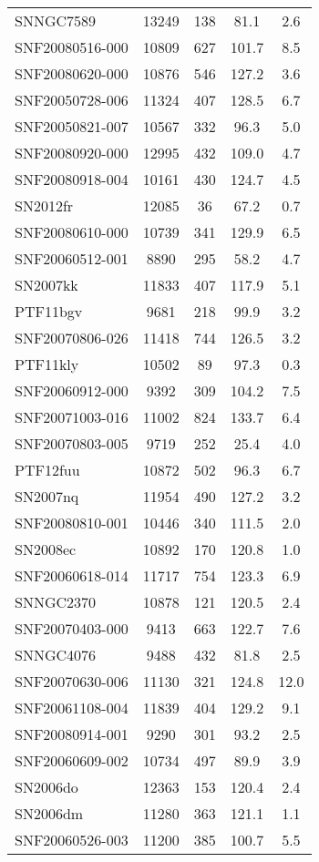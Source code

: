 \begin{longtable}{lcccc}
SNNGC7589 & 13249 & 138 & 81.1 & 2.6 \\
SNF20080516-000 & 10809 & 627 & 101.7 & 8.5 \\
SNF20080620-000 & 10876 & 546 & 127.2 & 3.6 \\
SNF20050728-006 & 11324 & 407 & 128.5 & 6.7 \\
SNF20050821-007 & 10567 & 332 & 96.3 & 5.0 \\
SNF20080920-000 & 12995 & 432 & 109.0 & 4.7 \\
SNF20080918-004 & 10161 & 430 & 124.7 & 4.5 \\
SN2012fr & 12085 & 36 & 67.2 & 0.7 \\
SNF20080610-000 & 10739 & 341 & 129.9 & 6.5 \\
SNF20060512-001 & 8890 & 295 & 58.2 & 4.7 \\
SN2007kk & 11833 & 407 & 117.9 & 5.1 \\
PTF11bgv & 9681 & 218 & 99.9 & 3.2 \\
SNF20070806-026 & 11418 & 744 & 126.5 & 3.2 \\
PTF11kly & 10502 & 89 & 97.3 & 0.3 \\
SNF20060912-000 & 9392 & 309 & 104.2 & 7.5 \\
SNF20071003-016 & 11002 & 824 & 133.7 & 6.4 \\
SNF20070803-005 & 9719 & 252 & 25.4 & 4.0 \\
PTF12fuu & 10872 & 502 & 96.3 & 6.7 \\
SN2007nq & 11954 & 490 & 127.2 & 3.2 \\
SNF20080810-001 & 10446 & 340 & 111.5 & 2.0 \\
SN2008ec & 10892 & 170 & 120.8 & 1.0 \\
SNF20060618-014 & 11717 & 754 & 123.3 & 6.9 \\
SNNGC2370 & 10878 & 121 & 120.5 & 2.4 \\
SNF20070403-000 & 9413 & 663 & 122.7 & 7.6 \\
SNNGC4076 & 9488 & 432 & 81.8 & 2.5 \\
SNF20070630-006 & 11130 & 321 & 124.8 & 12.0 \\
SNF20061108-004 & 11839 & 404 & 129.2 & 9.1 \\
SNF20080914-001 & 9290 & 301 & 93.2 & 2.5 \\
SNF20060609-002 & 10734 & 497 & 89.9 & 3.9 \\
SN2006do & 12363 & 153 & 120.4 & 2.4 \\
SN2006dm & 11280 & 363 & 121.1 & 1.1 \\
SNF20060526-003 & 11200 & 385 & 100.7 & 5.5 \\

\end{longtable}
